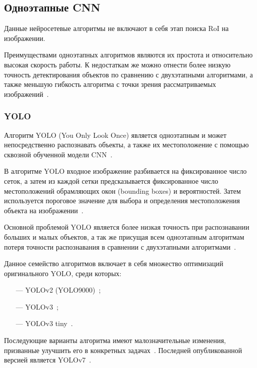 \subsection{Одноэтапные CNN}

Данные нейросетевые алгоритмы не включают в себя этап поиска RoI на изображении.


Преимуществами одноэтапных алгоритмов являются их простота и относительно высокая скорость работы. К недостаткам же можно отнести более низкую точность детектирования объектов по сравнению с двухэтапными алгоритмами, а также меньшую гибкость алгоритма с точки зрения рассматриваемых изображений~\cite{review-on-one-stage-object-detection}.

\subsubsection*{YOLO}

Алгоритм YOLO (You Only Look Once) является одноэтапным и может непосредственно распознавать объекты, а также их местоположение с помощью сквозной обученной модели CNN~\cite{yolo-review}.

В алгоритме YOLO входное изображение разбивается на фиксированное число сеток, а затем из каждой сетки предсказывается фиксированное число местоположений обрамляющих окон (bounding boxes) и вероятностей. Затем используется пороговое значение для выбора и определения местоположения объекта на изображении~\cite{yolo-review}.

Основной проблемой YOLO является более низкая точность при распознавании больших и малых объектов, а так же присущая всем одноэтапным алгоритмам потеря точности распознавания в сравнении с двухэтапными алгоритмами~\cite{yolo-review}.

Данное семейство алгоритмов включает в себя множество оптимизаций оригинального YOLO, среди которых:

\begin{itemize}
    \item[---] YOLOv2 (YOLO9000)~\cite{yolo9000};
    \item[---] YOLOv3~\cite{yolov3};
    \item[---] YOLOv3 tiny~\cite{yolov3-tiny}.
\end{itemize}

Последующие варианты алгоритма имеют малозначительные изменения, призванные улучшить его в конкретных задачах~\cite{yolov3-ships}. Последней опубликованной версией является YOLOv7~\cite{yolov7}.

